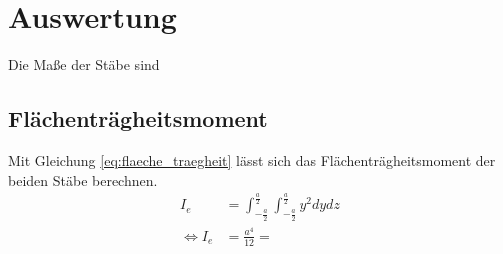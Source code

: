 \section{Auswertung}
\label{sec:Auswertung}
Die Maße der Stäbe sind


\subsection{Flächenträgheitsmoment}

Mit Gleichung \eqref{eq:flaeche_traegheit} lässt sich das Flächenträgheitsmoment der beiden Stäbe berechnen.
\begin{align*}
    I_{e} &=  \int_{-\frac{a}{2}}^{\frac{a}{2}}\int_{-\frac{a}{2}}^{\frac{a}{2}} y^2 dydz\\
    \Leftrightarrow I_{e} &= \frac{a^4}{12} = 
\end{align*}
